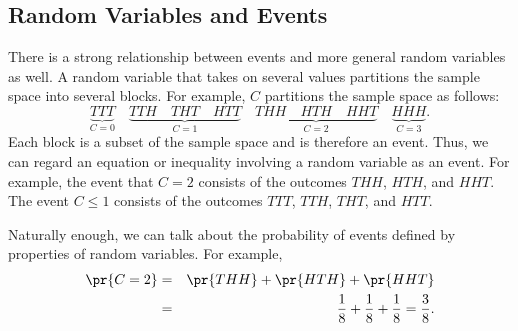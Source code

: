 \subsection{Random Variables and Events}

There is a strong relationship between events and more general random
variables as well.  A random variable that takes on several values
partitions the sample space into several blocks.  For example, $C$
partitions the sample space as follows:
\[
\underbrace{TTT}_{\text{$C = 0$}} \quad
\underbrace{TTH \quad THT \quad HTT}_{\text{$C = 1$}} \quad
\underbrace{THH \quad HTH \quad HHT}_{\text{$C = 2$}} \quad
\underbrace{HHH}_{\text{$C = 3$}}.
\]
Each block is a subset of the sample space and is therefore
an event.  Thus, we can regard an equation or inequality involving a
random variable as an event.  For example, the event that $C = 2$
consists of the outcomes $THH$, $HTH$, and $HHT$.  The event $C \leq
1$ consists of the outcomes $TTT$, $TTH$, $THT$, and $HTT$.

Naturally enough, we can talk about the probability of events defined
by properties of random variables.  For example, 
\begin{eqnarray*}
\pr{C = 2}
        & = &   \pr{THH} + \pr{HTH} + \pr{HHT} \\
        & = &   \frac{1}{8} + \frac{1}{8} + \frac{1}{8} =  \frac{3}{8}.
\end{eqnarray*}


